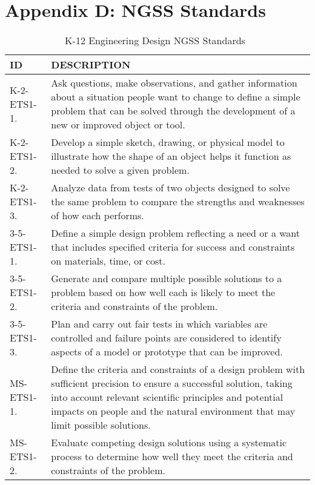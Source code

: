 
\chapter{Appendix D: NGSS Standards} %

\label{AppendixNGSS} %


\begin{longtable}{p{1.8cm}p{11cm}}
\caption{K-12 Engineering Design NGSS Standards~\cite{ngss}} \\
\textbf{ID} & \textbf{DESCRIPTION} \\ \hline
K-2-ETS1-1. & Ask questions, make observations, and gather information about a situation people want to change to define a simple problem that can be solved through the development of a new or improved object or tool.\\ \hline
K-2-ETS1-2. & Develop a simple sketch, drawing, or physical model to illustrate how the shape of an object helps it function as needed to solve a given problem.\\ \hline
K-2-ETS1-3. & Analyze data from tests of two objects designed to solve the same problem to compare the strengths and weaknesses of how each performs.\\ \hline
3-5-ETS1-1. & Define a simple design problem reflecting a need or a want that includes specified criteria for success and constraints on materials, time, or cost.\\ \hline
3-5-ETS1-2. & Generate and compare multiple possible solutions to a problem based on how well each is likely to meet the criteria and constraints of the problem.\\ \hline
3-5-ETS1-3. & Plan and carry out fair tests in which variables are controlled and failure points are considered to identify aspects of a model or prototype that can be improved.\\ \hline
MS-ETS1-1. & Define the criteria and constraints of a design problem with sufficient precision to ensure a successful solution, taking into account relevant scientific principles and potential impacts on people and the natural environment that may limit possible solutions.\\ \hline
MS-ETS1-2. & Evaluate competing design solutions using a systematic process to determine how well they meet the criteria and constraints of the problem.\\ \hline

\end{longtable}
